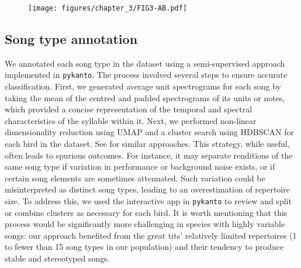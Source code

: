\begin{figure}
    \centering
    \texttt{[image: figures/chapter\_3/FIG3-AB.pdf]}
    \label{c3_fig:queries}
\end{figure}

\subsection{Song type annotation}

We annotated each song type in the dataset using a semi-supervised approach implemented in \texttt{pykanto}. The process involved several steps to ensure accurate classification. First, we generated average unit spectrograms for each song by taking the mean of the centred and padded spectrograms of its units or notes, which provided a concise representation of the temporal and spectral characteristics of the syllable within it. Next, we performed non-linear dimensionality reduction using UMAP \parencite{mcinnes2018} and a cluster search using HDBSCAN \parencite{mcinnes2017} for each bird in the dataset. See \parencite{sainburg2020a, thomas2021} for similar approaches. This strategy, while useful, often leads to spurious outcomes. For instance, it may separate renditions of the same song type if variation in performance or background noise exists, or if certain song elements are sometimes attenuated. Such variation could be misinterpreted as distinct song types, leading to an overestimation of repertoire size. To address this, we used the interactive app in \texttt{pykanto} to review and split or combine clusters as necessary for each bird. It is worth mentioning that this process would be significantly more challenging in species with highly variable songs: our approach benefited from the great tits' relatively limited repertoires (1 to fewer than 15 song types in our population) and their tendency to produce stable and stereotyped songs.

